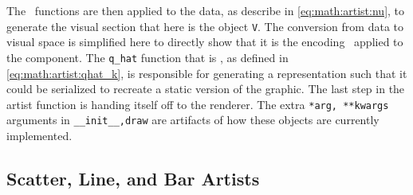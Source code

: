 \documentclass[../main.tex]{subfiles}
\begin{document}
 The \vchannel\ functions are then applied to the data, as describe in \autoref{eq:math:artist:nu}, to generate the visual section \vsection that here is the object \texttt{V}. The conversion from data to visual space is simplified here to directly show that it is the encoding \vchannel\ applied to the component. The \texttt{q_hat} function that is \vmarkd,  as defined in \autoref{eq:math:artist:qhat_k}, is responsible for generating a representation such that it could be serialized to recreate a static version of the graphic. The last step in the artist function is handing itself off to the renderer. The extra \texttt{*arg, **kwargs} arguments in \texttt{__init__,draw} are artifacts of how these objects are currently implemented.

 \subsection{Scatter, Line, and Bar Artists}
 \label{sec:code:artists}
\end{document}
